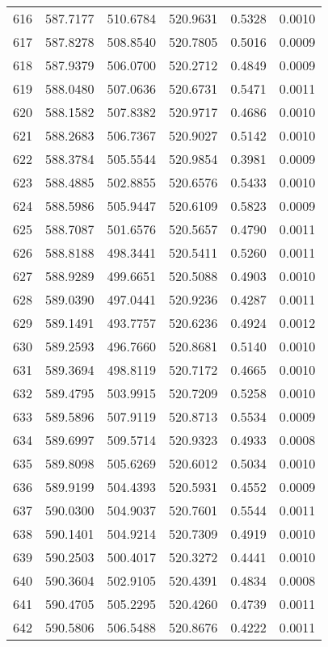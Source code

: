 \documentclass{article}
\begin{document}
\begin{longtable}{|c|c|c|c|c|c|}
616 & 587.7177 & 510.6784 & 520.9631 & 0.5328 & 0.0010 \\
617 & 587.8278 & 508.8540 & 520.7805 & 0.5016 & 0.0009 \\
618 & 587.9379 & 506.0700 & 520.2712 & 0.4849 & 0.0009 \\
619 & 588.0480 & 507.0636 & 520.6731 & 0.5471 & 0.0011 \\
620 & 588.1582 & 507.8382 & 520.9717 & 0.4686 & 0.0010 \\
621 & 588.2683 & 506.7367 & 520.9027 & 0.5142 & 0.0010 \\
622 & 588.3784 & 505.5544 & 520.9854 & 0.3981 & 0.0009 \\
623 & 588.4885 & 502.8855 & 520.6576 & 0.5433 & 0.0010 \\
624 & 588.5986 & 505.9447 & 520.6109 & 0.5823 & 0.0009 \\
625 & 588.7087 & 501.6576 & 520.5657 & 0.4790 & 0.0011 \\
626 & 588.8188 & 498.3441 & 520.5411 & 0.5260 & 0.0011 \\
627 & 588.9289 & 499.6651 & 520.5088 & 0.4903 & 0.0010 \\
628 & 589.0390 & 497.0441 & 520.9236 & 0.4287 & 0.0011 \\
629 & 589.1491 & 493.7757 & 520.6236 & 0.4924 & 0.0012 \\
630 & 589.2593 & 496.7660 & 520.8681 & 0.5140 & 0.0010 \\
631 & 589.3694 & 498.8119 & 520.7172 & 0.4665 & 0.0010 \\
632 & 589.4795 & 503.9915 & 520.7209 & 0.5258 & 0.0010 \\
633 & 589.5896 & 507.9119 & 520.8713 & 0.5534 & 0.0009 \\
634 & 589.6997 & 509.5714 & 520.9323 & 0.4933 & 0.0008 \\
635 & 589.8098 & 505.6269 & 520.6012 & 0.5034 & 0.0010 \\
636 & 589.9199 & 504.4393 & 520.5931 & 0.4552 & 0.0009 \\
637 & 590.0300 & 504.9037 & 520.7601 & 0.5544 & 0.0011 \\
638 & 590.1401 & 504.9214 & 520.7309 & 0.4919 & 0.0010 \\
639 & 590.2503 & 500.4017 & 520.3272 & 0.4441 & 0.0010 \\
640 & 590.3604 & 502.9105 & 520.4391 & 0.4834 & 0.0008 \\
641 & 590.4705 & 505.2295 & 520.4260 & 0.4739 & 0.0011 \\
642 & 590.5806 & 506.5488 & 520.8676 & 0.4222 & 0.0011 \\

\end{longtable}
\end{document}
